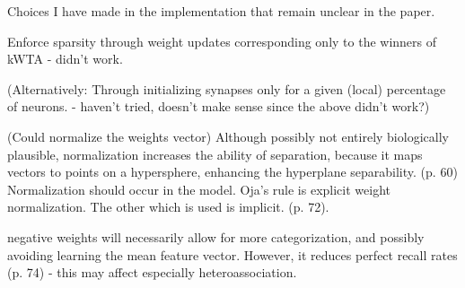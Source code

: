 Choices I have made in the implementation that remain unclear in the paper.

Enforce sparsity through weight updates corresponding only to the winners of kWTA - didn't work.

(Alternatively: Through initializing synapses only for a given (local) percentage of neurons. - haven't tried, doesn't make sense since the above didn't work?)

(Could normalize the weights vector)
Although possibly not entirely biologically plausible, normalization increases the ability of separation, because it maps vectors to points on a hypersphere, enhancing the hyperplane separability. (p. 60)
Normalization should occur in the model. Oja's rule is explicit weight normalization. The other which is used is implicit. (p. 72).

negative weights will necessarily allow for more categorization, and possibly avoiding learning the mean feature vector. However, it reduces perfect recall rates (p. 74) - this may affect especially heteroassociation.
